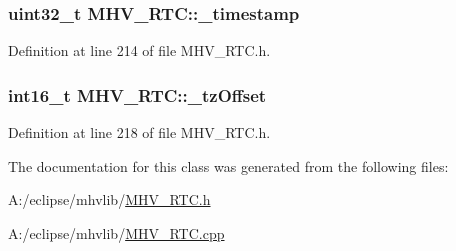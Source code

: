 \hypertarget{class_m_h_v___r_t_c_a6ac0d6f1b8985cd6113249693da50104}{
\subsubsection[{\-\_\-timestamp}]{\setlength{\rightskip}{0pt plus 5cm}uint32\-\_\-t {\bf \-M\-H\-V\-\_\-\-R\-T\-C\-::\-\_\-timestamp}}}
\label{class_m_h_v___r_t_c_a6ac0d6f1b8985cd6113249693da50104}


\-Definition at line 214 of file \-M\-H\-V\-\_\-\-R\-T\-C.\-h.

\hypertarget{class_m_h_v___r_t_c_af9e544307713892ec196261247213490}{
\subsubsection[{\-\_\-tz\-Offset}]{\setlength{\rightskip}{0pt plus 5cm}int16\-\_\-t {\bf \-M\-H\-V\-\_\-\-R\-T\-C\-::\-\_\-tz\-Offset}}}
\label{class_m_h_v___r_t_c_af9e544307713892ec196261247213490}


\-Definition at line 218 of file \-M\-H\-V\-\_\-\-R\-T\-C.\-h.



\-The documentation for this class was generated from the following files\-:\begin{DoxyCompactItemize}
\item 
\-A\-:/eclipse/mhvlib/\hyperlink{_m_h_v___r_t_c_8h}{\-M\-H\-V\-\_\-\-R\-T\-C.\-h}\item 
\-A\-:/eclipse/mhvlib/\hyperlink{_m_h_v___r_t_c_8cpp}{\-M\-H\-V\-\_\-\-R\-T\-C.\-cpp}\end{DoxyCompactItemize}
